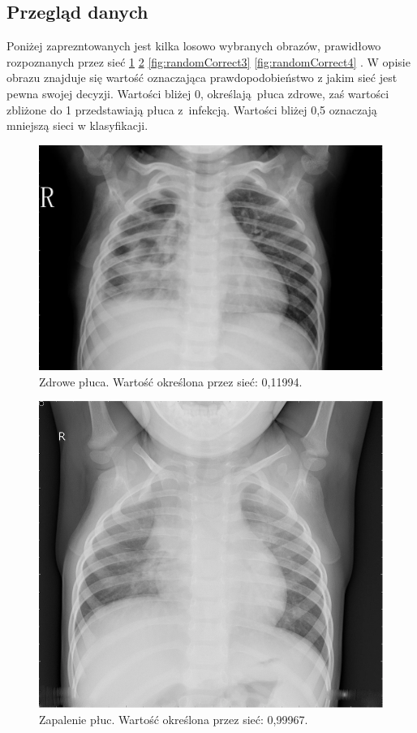 \documentclass[12pt,a4paper,twoside,titlepage,openright]{book}
\begin{document}
\begin{itemize}
\begin{itemize}
\subsection{Przegląd danych}
Poniżej zaprezntowanych jest kilka losowo wybranych obrazów, prawidłowo rozpoznanych przez sieć \ref{fig:randomCorrect1} \ref{fig:randomCorrect2} \ref{fig:randomCorrect3} \ref{fig:randomCorrect4} . W opisie obrazu znajduje się wartość oznaczająca prawdopodobieństwo z jakim sieć jest pewna swojej decyzji. Wartości bliżej 0, określają płuca zdrowe, zaś wartości zbliżone do 1 przedstawiają płuca z infekcją. Wartości bliżej 0,5 oznaczają mniejszą sieci w klasyfikacji.

\begin{figure}[ht]
	\centering
			\includegraphics[resolution=100, scale=0.3]{randomCorrect1.png}
		\caption{Zdrowe płuca. Wartość określona przez sieć: 0,11994.}
				\label{fig:randomCorrect1}
\end{figure}

\begin{figure}[ht]
	\centering
			\includegraphics[resolution=100, scale=0.3]{randomCorrect2.png}
		\caption{Zapalenie płuc. Wartość określona przez sieć: 0,99967.}
				\label{fig:randomCorrect2}
\end{figure}


\end{itemize}
\end{itemize}
\end{document}
